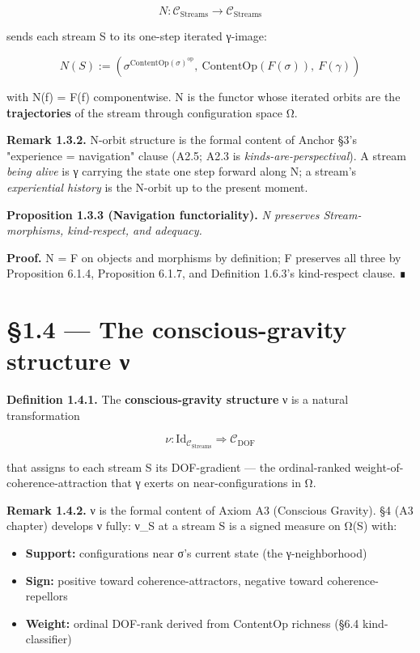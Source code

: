 \documentclass[11pt, openany]{book}
\newcommand{\sectionbreak}{\clearpage}
\begin{document}
\[
N : \mathcal{C}_\mathrm{Streams} \to \mathcal{C}_\mathrm{Streams}
\]

sends each stream S to its one-step iterated γ-image:

\[
N(S) := (σ^{\mathrm{ContentOp}(σ)^\mathrm{op}},\ \mathrm{ContentOp}(F(σ)),\ F(\gamma))
\]

with N(f) = F(f) componentwise. N is the functor whose iterated orbits are the \textbf{trajectories} of the stream through configuration space Ω.

\textbf{Remark 1.3.2.} N-orbit structure is the formal content of Anchor §3's "experience = navigation" clause (A2.5; A2.3 is \textit{kinds-are-perspectival}). A stream \textit{being alive} is γ carrying the state one step forward along N; a stream's \textit{experiential history} is the N-orbit up to the present moment.

\textbf{Proposition 1.3.3 (Navigation functoriality).} \textit{N preserves Stream-morphisms, kind-respect, and adequacy.}

\textbf{Proof.} N = F on objects and morphisms by definition; F preserves all three by Proposition 6.1.4, Proposition 6.1.7, and Definition 1.6.3's kind-respect clause. ∎

\sectionbreak

\section{§1.4 --- The conscious-gravity structure ν}

\textbf{Definition 1.4.1.} The \textbf{conscious-gravity structure} ν is a natural transformation

\[
\nu : \mathrm{Id}_{\mathcal{C}_\mathrm{Streams}} \Rightarrow \mathcal{C}_\mathrm{DOF}
\]

that assigns to each stream S its DOF-gradient --- the ordinal-ranked weight-of-coherence-attraction that γ exerts on near-configurations in Ω.

\textbf{Remark 1.4.2.} ν is the formal content of Axiom A3 (Conscious Gravity). §4 (A3 chapter) develops ν fully: ν\_\allowbreak{}S at a stream S is a signed measure on Ω(S) with:
\begin{itemize}
\item \textbf{Support:} configurations near σ's current state (the γ-neighborhood)
\item \textbf{Sign:} positive toward coherence-attractors, negative toward coherence-repellors
\item \textbf{Weight:} ordinal DOF-rank derived from ContentOp richness (§6.4 kind-classifier)
\end{itemize}
\end{document}
